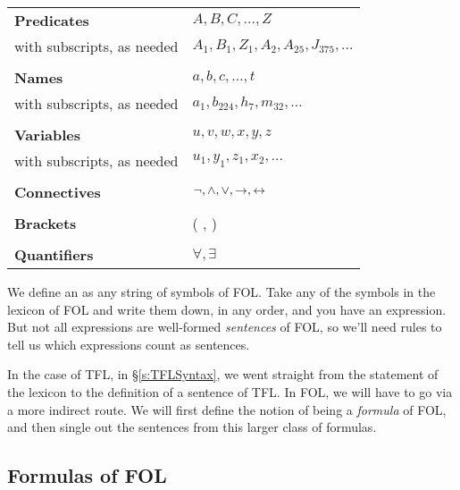 \begin{center}
\begin{tabular}{l l}
\textbf{Predicates} & $A,B,C,\ldots,Z$\\
with subscripts, as needed & $A_1, B_1,Z_1,A_2,A_{25},J_{375},\ldots$\\
\\
\textbf{Names} & $a,b,c,\ldots, t$\\
with subscripts, as needed & $a_1, b_{224}, h_7, m_{32},\ldots$\\
\\
\textbf{Variables} & $u, v, w, x,y,z$\\
with subscripts, as needed & $u_1, y_1, z_1, x_2,\ldots$\\
\\
\textbf{Connectives} & $\neg,\wedge,\vee,\rightarrow,\leftrightarrow$\\
\\
\textbf{Brackets} &( , )\\
\\
\textbf{Quantifiers} & $\forall, \exists$\\
\end{tabular}
\end{center}
We define an  as any string of symbols of FOL. Take any of the symbols in the lexicon of FOL and write them down, in any order, and you have an expression.  But not all expressions are well-formed \emph{sentences} of FOL, so we'll need rules to tell us which expressions count as sentences.


In the case of TFL, in \S\ref{s:TFLSyntax}, we went straight from the statement of the lexicon to the definition of a sentence of TFL. In FOL, we will have to go via a more indirect route.  We will first define the notion of being a  \emph{formula} of FOL, and then single out the sentences from this larger class of formulas.

\subsection{Formulas of FOL}

